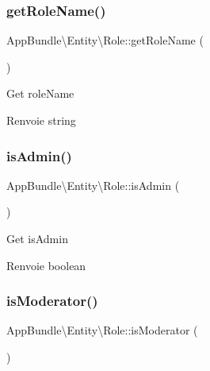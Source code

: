 \subsubsection{\texorpdfstring{get\+Role\+Name()}{getRoleName()}}
{\footnotesize\ttfamily App\+Bundle\textbackslash{}\+Entity\textbackslash{}\+Role\+::get\+Role\+Name (\begin{DoxyParamCaption}{ }\end{DoxyParamCaption})}

Get role\+Name

\begin{DoxyReturn}{Renvoie}
string 
\end{DoxyReturn}
\mbox{\label{classAppBundle_1_1Entity_1_1Role_a288a7e5a21441f16a3ff077b37b27602}} 
\subsubsection{\texorpdfstring{is\+Admin()}{isAdmin()}}
{\footnotesize\ttfamily App\+Bundle\textbackslash{}\+Entity\textbackslash{}\+Role\+::is\+Admin (\begin{DoxyParamCaption}{ }\end{DoxyParamCaption})}

Get is\+Admin

\begin{DoxyReturn}{Renvoie}
boolean 
\end{DoxyReturn}
\mbox{\label{classAppBundle_1_1Entity_1_1Role_a659892168df4ecc1e6f447c297045240}} 
\subsubsection{\texorpdfstring{is\+Moderator()}{isModerator()}}
{\footnotesize\ttfamily App\+Bundle\textbackslash{}\+Entity\textbackslash{}\+Role\+::is\+Moderator (\begin{DoxyParamCaption}{ }\end{DoxyParamCaption})}

